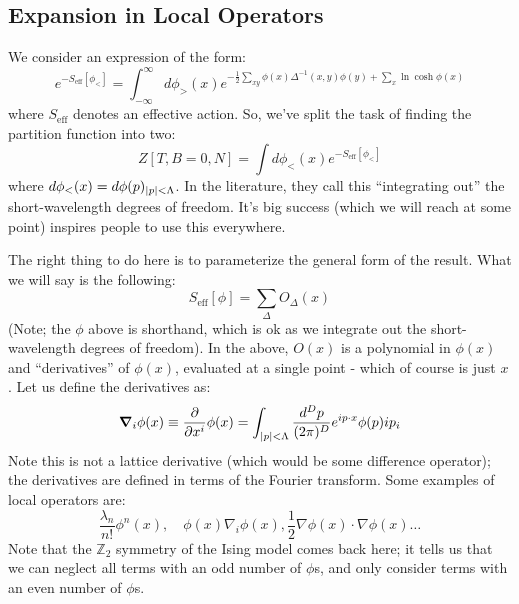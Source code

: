 \subsection{Expansion in Local Operators}
\begin{comment}
Since we are really only interested in the behaviour near the critical points, the prefactor:
\begin{equation}
    \frac{2^Ne^{-\frac{NDJ}{k_B T}}}{\sqrt{\det(2\pi\Delta)}}
\end{equation}
is smooth at $T_c$, so we can neglect it.
\end{comment}
We consider an expression of the form:
\begin{equation}
    e^{-S_{\text{eff}}[\phi_<]} = \int_{-\infty}^\infty d\phi_>(x) e^{-\frac{1}{2}\sum_{xy}\phi(x)\Delta^{-1}(x, y)\phi(y) + \sum_x \ln\cosh\phi(x)}
\end{equation}
where $S_{\text{eff}}$ denotes an effective action. So, we've split the task of finding the partition function into two:
\begin{equation}
    Z[T, B=0, N] = \int d\phi_<(x) e^{-S_{\text{eff}}[\phi_<]}
\end{equation}
where $d\phi_<(x) = d\phi(p)_{\abs{p} <\Lambda}$. In the literature, they call this ``integrating out'' the short-wavelength degrees of freedom. It's big success (which we will reach at some point) inspires people to use this everywhere. 

The right thing to do here is to parameterize the general form of the result. What we will say is the following:
\begin{equation}
    S_{\text{eff}}[\phi] = \sum_{\Delta}O_\Delta(x)
\end{equation}
(Note; the $\phi$ above is shorthand, which is ok as we integrate out the short-wavelength degrees of freedom). In the above, $O(x)$ is a polynomial in $\phi(x)$ and ``derivatives'' of $\phi(x)$, evaluated at a single point - which of course is just $x$. Let us define the derivatives as:
\begin{equation}
    \nabla_i \phi(x) \equiv \dpd{}{x^i}\phi(x) = \int_{\abs{p} < \Lambda} \frac{d^Dp}{(2\pi)^D} e^{ip \cdot x}\phi(p)ip_i
\end{equation}
Note this is not a lattice derivative (which would be some difference operator); the derivatives are defined in terms of the Fourier transform. Some examples of local operators are:
\begin{equation}
    \frac{\lambda_n}{n!}\phi^n(x), \quad \phi(x)\nabla_i\phi(x), \frac{1}{2}\nabla \phi(x) \cdot \nabla \phi(x) \ldots 
\end{equation}
Note that the $\mathbb{Z}_2$ symmetry of the Ising model comes back here; it tells us that we can neglect all terms with an odd number of $\phi$s, and only consider terms with an even number of $\phi$s.

